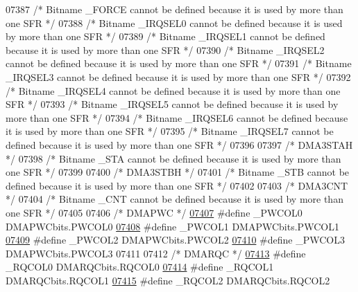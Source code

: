 \begin{DoxyCode}
07387 \textcolor{comment}{/* Bitname \_FORCE cannot be defined because it is used by more than one SFR */}
07388 \textcolor{comment}{/* Bitname \_IRQSEL0 cannot be defined because it is used by more than one SFR */}
07389 \textcolor{comment}{/* Bitname \_IRQSEL1 cannot be defined because it is used by more than one SFR */}
07390 \textcolor{comment}{/* Bitname \_IRQSEL2 cannot be defined because it is used by more than one SFR */}
07391 \textcolor{comment}{/* Bitname \_IRQSEL3 cannot be defined because it is used by more than one SFR */}
07392 \textcolor{comment}{/* Bitname \_IRQSEL4 cannot be defined because it is used by more than one SFR */}
07393 \textcolor{comment}{/* Bitname \_IRQSEL5 cannot be defined because it is used by more than one SFR */}
07394 \textcolor{comment}{/* Bitname \_IRQSEL6 cannot be defined because it is used by more than one SFR */}
07395 \textcolor{comment}{/* Bitname \_IRQSEL7 cannot be defined because it is used by more than one SFR */}
07396 
07397 \textcolor{comment}{/* DMA3STAH */}
07398 \textcolor{comment}{/* Bitname \_STA cannot be defined because it is used by more than one SFR */}
07399 
07400 \textcolor{comment}{/* DMA3STBH */}
07401 \textcolor{comment}{/* Bitname \_STB cannot be defined because it is used by more than one SFR */}
07402 
07403 \textcolor{comment}{/* DMA3CNT */}
07404 \textcolor{comment}{/* Bitname \_CNT cannot be defined because it is used by more than one SFR */}
07405 
07406 \textcolor{comment}{/* DMAPWC */}
\hypertarget{a00009_source_l07407}{}\hyperlink{a00009_a78261a8bcc86c9723267d2f11a46bbb8}{07407} \textcolor{preprocessor}{#define \_PWCOL0 DMAPWCbits.PWCOL0}
\hypertarget{a00009_source_l07408}{}\hyperlink{a00009_a47a179691d6d01f84dfd7ef4feff5ffe}{07408} \textcolor{preprocessor}{#define \_PWCOL1 DMAPWCbits.PWCOL1}
\hypertarget{a00009_source_l07409}{}\hyperlink{a00009_ab8c9480f601d9ff8b94b0d6a57f72ea6}{07409} \textcolor{preprocessor}{#define \_PWCOL2 DMAPWCbits.PWCOL2}
\hypertarget{a00009_source_l07410}{}\hyperlink{a00009_a2f96e2e030244acf7b0a3243d23bf3f2}{07410} \textcolor{preprocessor}{#define \_PWCOL3 DMAPWCbits.PWCOL3}
07411 
07412 \textcolor{comment}{/* DMARQC */}
\hypertarget{a00009_source_l07413}{}\hyperlink{a00009_a43c50cbc6095bc73e88250f9ee123e6d}{07413} \textcolor{preprocessor}{#define \_RQCOL0 DMARQCbits.RQCOL0}
\hypertarget{a00009_source_l07414}{}\hyperlink{a00009_ac9b999e7b46b4241fccb7947a561ef9f}{07414} \textcolor{preprocessor}{#define \_RQCOL1 DMARQCbits.RQCOL1}
\hypertarget{a00009_source_l07415}{}\hyperlink{a00009_a90b59f07fdbb32f69deac93ba3d29c35}{07415} \textcolor{preprocessor}{#define \_RQCOL2 DMARQCbits.RQCOL2}

\end{DoxyCode}
